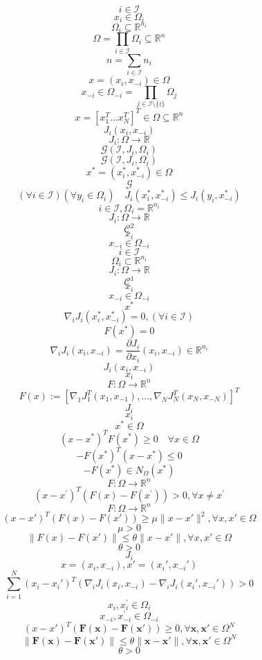 \documentclass[11pt]{ctexart}
\begin{document}
$$i\in{\mathcal I}$$
$$x_{i}\in\Omega_{i}$$
$$\Omega_{i}\subseteq\mathbb{R}^{n_{i}}$$
$$\Omega=\prod_{i\in\mathcal{I}}\Omega_{i}\subseteq\mathbb{R}^{n}$$
$$n=\sum_{i\in\mathcal{I}}n_{i}$$
$$x=(x_{i},x_{-i})\in\Omega $$
$$x_{-i}\in\Omega_{-i}=\prod_{j\in\mathcal{I}\setminus\{i\}}\Omega_{j}$$
$$x=[x_{1}^{T}\ldots x_{N}^{T}]^{T}\in\Omega\subseteq\mathbb{R}^{n}$$
$$J_{i}(x_{i},x_{-i})$$
$$J_{i}:\Omega\rightarrow\mathbb{R}$$
$$\mathcal{G}(\mathcal{I},J_{i},\Omega_{i})$$
$$\mathcal{G}(\mathcal{I},J_{i},\Omega_{i})$$
$$x^{*}=(x_{i}^{*},x_{-i}^{*})\in\Omega $$
$$\mathcal{G}$$
$$(\forall i\in\mathcal{I})(\forall y_i\in\Omega_i)\quad J_i(x_i^*,x_{-i}^*)\leq J_i(y_i,x_{-i}^*)$$
$$i\in\mathcal{I},\Omega_{i}=\mathbb{R}^{n_{i}}$$
$$J_{i}:\Omega\rightarrow\mathbb{R}$$
$$\mathcal{C}^{2}$$
$$x_{i}$$
$$x_{-i}\in\Omega_{-i}$$
$$i\in{\mathcal I}$$
$$\Omega_{i}\subset\mathbb{R}^{n_{i}}$$
$$J_{i}:\Omega\rightarrow\mathbb{R}$$
$$\mathcal{C}^{1}$$
$$x_{i}$$
$$x_{-i}\in\Omega_{-i}$$
$$x^{*}$$
$$\nabla_iJ_i(x_i^*,x_{-i}^*)=0,(\forall i\in\mathcal{I})$$
$$F(x^{*})=0$$
$$\nabla_iJ_i(x_i,x_{-i})=\frac{\partial J_i}{\partial x_i}(x_i,x_{-i})\in\mathbb{R}^{n_i}$$
$$J_{i}(x_{i},x_{-i})$$
$$x_{i}$$
$$F:\Omega\rightarrow\mathbb{R}^{n}$$
$$F(x):=[\nabla_{1}J_{1}^{T}(x_{1},x_{-1}),\ldots,\nabla_{N}J_{N}^{T}(x_{N},x_{-N})]^{T}$$
$$J_{i}$$
$$x_{i}$$
$$x^{*}\in\Omega $$
$$(x-x^{*})^{T}F(x^{*})\geq0\quad\forall x\in\Omega $$
$$-F(x^{*})^{T}\left(x-x^{*}\right)\leq0$$
$$-F(x^{*})\in N_{\Omega}(x^{*})$$
$$F:\Omega\to\mathbb{R}^n$$
$$(x-x^{\prime})^{T}\left(F(x)-F(x^{\prime})\right)>0,\forall x\neq x^{\prime}$$
$$F:\Omega\to\mathbb{R}^n$$
$$(x-x')^{T}\left(F(x)-F(x')\right)\geq\mu\|x-x'\|^{2},\forall x,x'\in\Omega $$
$$\mu>0$$
$$\|F(x)-F(x')\|\leq\theta\|x-x'\|,\forall x,x'\in\Omega $$
$$\theta>0$$
$$J_{i}$$
$$x=(x_{i},x_{-i}),x'=(x_{i}',x_{-i}')$$
$$\displaystyle\sum_{i=1}^N(x_i-x_i')^T\left(\nabla_iJ_i(x_i,x_{-i})-\nabla_iJ_i(x_i',x_{-i}')\right)>0$$
$$x_{i},x_{i}^{\prime}\in\Omega_{i}$$
$$x_{-i},x_{-i}^{\prime}\in\Omega_{-i}$$
$$(x-x')^T\left(\mathbf{F}(\mathbf{x})-\mathbf{F}(\mathbf{x}')\right)\geq0,\forall\mathbf{x},\mathbf{x}'\in\Omega^N$$
$$\|\mathbf{F}(\mathbf{x})-\mathbf{F}(\mathbf{x}')\|\leq\theta\|\mathbf{x}-\mathbf{x}'\|,\forall\mathbf{x},\mathbf{x}'\in\Omega^N$$
$$\theta>0$$
\end{document}
